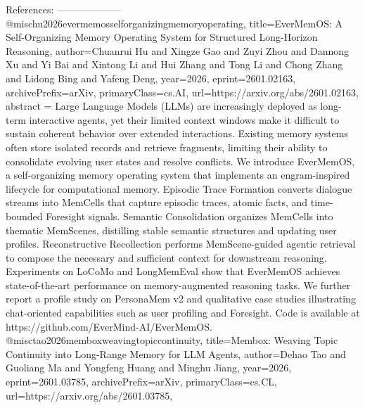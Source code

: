         References:
        --------------------
        @misc{hu2026evermemosselforganizingmemoryoperating,
      title={EverMemOS: A Self-Organizing Memory Operating System for Structured Long-Horizon Reasoning}, 
      author={Chuanrui Hu and Xingze Gao and Zuyi Zhou and Dannong Xu and Yi Bai and Xintong Li and Hui Zhang and Tong Li and Chong Zhang and Lidong Bing and Yafeng Deng},
      year={2026},
      eprint={2601.02163},
      archivePrefix={arXiv},
      primaryClass={cs.AI},
      url={https://arxiv.org/abs/2601.02163},
      abstract = {Large Language Models (LLMs) are increasingly deployed as long-term interactive agents, yet their limited context windows make it difficult to sustain coherent behavior over extended interactions. Existing memory systems often store isolated records and retrieve fragments, limiting their ability to consolidate evolving user states and resolve conflicts. We introduce EverMemOS, a self-organizing memory operating system that implements an engram-inspired lifecycle for computational memory. Episodic Trace Formation converts dialogue streams into MemCells that capture episodic traces, atomic facts, and time-bounded Foresight signals. Semantic Consolidation organizes MemCells into thematic MemScenes, distilling stable semantic structures and updating user profiles. Reconstructive Recollection performs MemScene-guided agentic retrieval to compose the necessary and sufficient context for downstream reasoning. Experiments on LoCoMo and LongMemEval show that EverMemOS achieves state-of-the-art performance on memory-augmented reasoning tasks. We further report a profile study on PersonaMem v2 and qualitative case studies illustrating chat-oriented capabilities such as user profiling and Foresight. Code is available at https://github.com/EverMind-AI/EverMemOS.}
}@misc{tao2026memboxweavingtopiccontinuity,
      title={Membox: Weaving Topic Continuity into Long-Range Memory for LLM Agents}, 
      author={Dehao Tao and Guoliang Ma and Yongfeng Huang and Minghu Jiang},
      year={2026},
      eprint={2601.03785},
      archivePrefix={arXiv},
      primaryClass={cs.CL},
      url={https://arxiv.org/abs/2601.03785},
}
